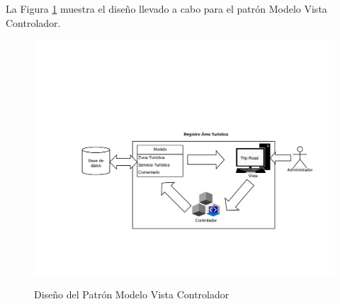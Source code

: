 La Figura \ref{fig:MVC} muestra el diseño llevado a cabo para el patrón Modelo Vista Controlador.\\

\begin{figure}[htbp]
	\begin{center}
		\hypertarget{fig:MVC}{
			\includegraphics[scale=.7]{propuestaSolicion/turismo/images/MVC2}
			\caption{Diseño del Patrón Modelo Vista Controlador}
		}
		\label{fig:MVC}
	\end{center}
\end{figure}